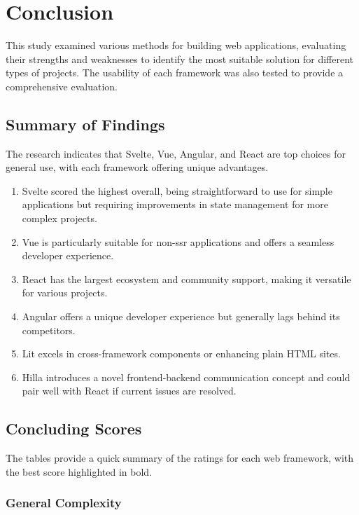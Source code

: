 \chapter{Conclusion}

This study examined various methods for building web applications, evaluating their strengths and weaknesses to identify the most suitable solution for different types of projects. The usability of each framework was also tested to provide a comprehensive evaluation.

\section{Summary of Findings}

The research indicates that Svelte, Vue, Angular, and React are top choices for general use, with each framework offering unique advantages.

\begin{enumerate}
    \item Svelte scored the highest overall, being straightforward to use for simple applications but requiring improvements in state management for more complex projects.
    \item Vue is particularly suitable for non-\acrshort{ssr} applications and offers a seamless developer experience.
    \item React has the largest ecosystem and community support, making it versatile for various projects.
    \item Angular offers a unique developer experience but generally lags behind its competitors.
    \item Lit excels in cross-framework components or enhancing plain HTML sites.
    \item Hilla introduces a novel frontend-backend communication concept and could pair well with React if current issues are resolved.
\end{enumerate}

\section{Concluding Scores}

The tables provide a quick summary of the ratings for each web framework, with the best score highlighted in bold.

\subsection{General Complexity}

